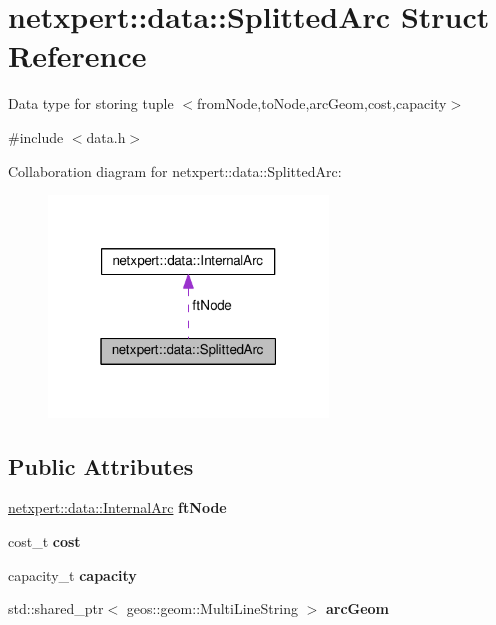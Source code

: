 \hypertarget{structnetxpert_1_1data_1_1SplittedArc}{}\section{netxpert\+:\+:data\+:\+:Splitted\+Arc Struct Reference}
\label{structnetxpert_1_1data_1_1SplittedArc}


Data type for storing tuple $<$from\+Node,to\+Node,arc\+Geom,cost,capacity$>$  




{\ttfamily \#include $<$data.\+h$>$}



Collaboration diagram for netxpert\+:\+:data\+:\+:Splitted\+Arc\+:\nopagebreak
\begin{figure}[H]
\begin{center}
\leavevmode
\includegraphics[width=211pt]{structnetxpert_1_1data_1_1SplittedArc__coll__graph}
\end{center}
\end{figure}
\subsection*{Public Attributes}
\begin{DoxyCompactItemize}
\item 
\hyperlink{structnetxpert_1_1data_1_1InternalArc}{netxpert\+::data\+::\+Internal\+Arc} {\bfseries ft\+Node}\hypertarget{structnetxpert_1_1data_1_1SplittedArc_a3aace0faa1861aa73cc19e8d09c9fb3c}{}\label{structnetxpert_1_1data_1_1SplittedArc_a3aace0faa1861aa73cc19e8d09c9fb3c}

\item 
cost\+\_\+t {\bfseries cost}\hypertarget{structnetxpert_1_1data_1_1SplittedArc_a8ec0717b28129abacfcf18c4c3895865}{}\label{structnetxpert_1_1data_1_1SplittedArc_a8ec0717b28129abacfcf18c4c3895865}

\item 
capacity\+\_\+t {\bfseries capacity}\hypertarget{structnetxpert_1_1data_1_1SplittedArc_a8b9bb43684e645f440c890783c8c0053}{}\label{structnetxpert_1_1data_1_1SplittedArc_a8b9bb43684e645f440c890783c8c0053}

\item 
std\+::shared\+\_\+ptr$<$ geos\+::geom\+::\+Multi\+Line\+String $>$ {\bfseries arc\+Geom}\hypertarget{structnetxpert_1_1data_1_1SplittedArc_ae8523bb6a235e0b448e80dbb91f182b0}{}\label{structnetxpert_1_1data_1_1SplittedArc_ae8523bb6a235e0b448e80dbb91f182b0}

\end{DoxyCompactItemize}


